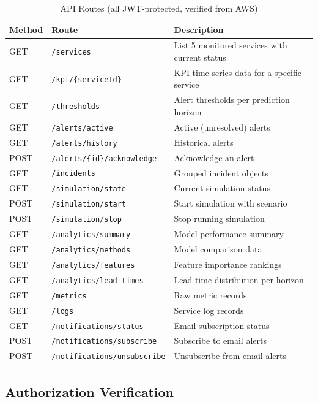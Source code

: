 \documentclass[11pt,a4paper]{article}
\begin{document}
\begin{table}[H]
\centering
\begin{tabular}{lll}
\toprule
\textbf{Method} & \textbf{Route} & \textbf{Description} \\
\midrule
GET & \texttt{/services} & List 5 monitored services with current status \\
GET & \texttt{/kpi/\{serviceId\}} & KPI time-series data for a specific service \\
GET & \texttt{/thresholds} & Alert thresholds per prediction horizon \\
GET & \texttt{/alerts/active} & Active (unresolved) alerts \\
GET & \texttt{/alerts/history} & Historical alerts \\
POST & \texttt{/alerts/\{id\}/acknowledge} & Acknowledge an alert \\
GET & \texttt{/incidents} & Grouped incident objects \\
GET & \texttt{/simulation/state} & Current simulation status \\
POST & \texttt{/simulation/start} & Start simulation with scenario \\
POST & \texttt{/simulation/stop} & Stop running simulation \\
GET & \texttt{/analytics/summary} & Model performance summary \\
GET & \texttt{/analytics/methods} & Model comparison data \\
GET & \texttt{/analytics/features} & Feature importance rankings \\
GET & \texttt{/analytics/lead-times} & Lead time distribution per horizon \\
GET & \texttt{/metrics} & Raw metric records \\
GET & \texttt{/logs} & Service log records \\
GET & \texttt{/notifications/status} & Email subscription status \\
POST & \texttt{/notifications/subscribe} & Subscribe to email alerts \\
POST & \texttt{/notifications/unsubscribe} & Unsubscribe from email alerts \\
\bottomrule
\end{tabular}
\caption{API Routes (all JWT-protected, verified from AWS)}
\label{tab:api-routes}
\end{table}

\subsection{Authorization Verification}
\end{document}
